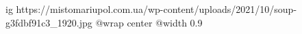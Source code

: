  
 
 
 
 

\ifcmt
  ig https://mistomariupol.com.ua/wp-content/uploads/2021/10/soup-g3fdbf91c3_1920.jpg
  @wrap center
  @width 0.9
\fi
